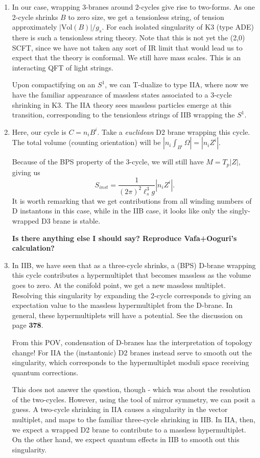 \documentclass[11pt, class=article, crop=false]{standalone}
\begin{document}
\begin{enumerate}
	\item In our case, wrapping 3-branes around 2-cycles give rise to two-forms. As one 2-cycle shrinks $B$ to zero size, we get a tensionless string, of tension approximately $|\text{Vol}(B)|/g_s$. For each isolated singularity of K3 (type ADE) there is such a tensionless string theory. Note that this is not yet the (2,0) SCFT, since we have not taken any sort of IR limit that would lead us to expect that the theory is conformal. We still have mass scales. This is an interacting QFT of light strings. 
	
	Upon compactifying on an $S^1$, we can T-dualize to type IIA, where now we have the familiar appearance of massless states associated to a 3-cycle shrinking in K3. The IIA theory sees massless particles emerge at this transition, corresponding to the tensionless strings of IIB wrapping the $S^1$.
	
	\item Here, our cycle is $C = n_i B^i$. Take a \emph{euclidean} D2 brane wrapping this cycle. The total volume (counting orientation) will be $|n_i \int_{B^i} \Omega| = |n_i Z^i|$. 
	
	Because of the BPS property of the 3-cycle, we will still have $M = T_p |Z|$, giving us
	\[
		S_{inst} = \frac{1}{(2\pi)^2 \ell_s^3 g} |n_i Z^i|.
	\]
	It is worth remarking that we get contributions from all winding numbers of D instantons in this case, while in the IIB case, it looks like only the singly-wrapped D3 brane is stable.
	
	\textbf{Is there anything else I should say? Reproduce Vafa+Ooguri's calculation?}
	
	\item In IIB, we have seen that as a three-cycle shrinks, a (BPS) D-brane wrapping this cycle contributes a hypermultiplet that becomes massless as the volume goes to zero. At the conifold point, we get a new massless multiplet. Resolving this singularity by expanding the 2-cycle corresponds to giving an expectation value to the massless hypermultiplet from the D-brane. In general, these hypermultiplets will have a potential. See the discussion on page \textbf{378}.
	
	From this POV, condensation of D-branes has the interpretation of topology change! For IIA the (instantonic) D2 branes instead serve to smooth out the singularity, which corresponds to the hypermultiplet moduli space receiving quantum corrections. 
	
	This does not answer the question, though - which was about the resolution of the two-cycles. However, using the tool of mirror symmetry, we can posit a guess. A two-cycle shrinking in IIA causes a singularity in the vector multiplet, and maps to the familiar three-cycle shrinking in IIB. In IIA, then, we expect a wrapped D2 brane to contribute to a massless hypermultiplet. On the other hand, we expect quantum effects in IIB to smooth out this singularity. 
	

\end{enumerate}
\end{document}

